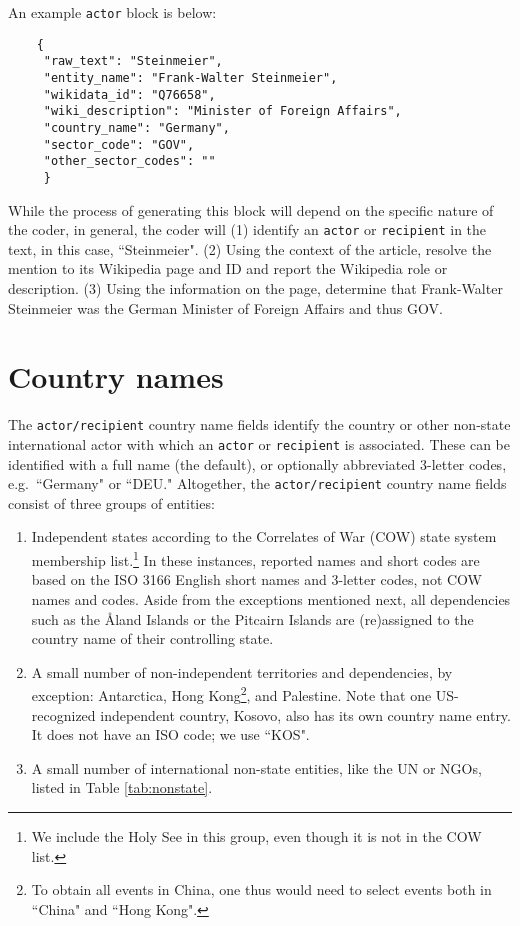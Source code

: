 \documentclass[11pt]{report}
\newcommand{\txt}[1]{\texttt{#1}}
\begin{document}
An example \txt{actor} block is below:

\begin{verbatim}
	{
	 "raw_text": "Steinmeier",
	 "entity_name": "Frank-Walter Steinmeier",
	 "wikidata_id": "Q76658",
	 "wiki_description": "Minister of Foreign Affairs",
	 "country_name": "Germany",
	 "sector_code": "GOV",
	 "other_sector_codes": ""
	 }
\end{verbatim}

While the process of generating this block will depend on the specific nature of the coder, in general, the coder will (1) identify an  \txt{actor} or \txt{recipient} in the text, in this case, ``Steinmeier". (2) Using the context of the article, resolve the mention to its Wikipedia page and ID and report the Wikipedia role or description. (3) Using the information on the page, determine that Frank-Walter Steinmeier was the German Minister of Foreign Affairs and thus GOV.

\section{Country names}

The \texttt{actor/recipient} country name fields identify the country or other non-state international actor with which an \texttt{actor} or \texttt{recipient} is associated. These can be identified with a full name (the default), or optionally abbreviated 3-letter codes, e.g.\ ``Germany" or ``DEU." Altogether, the \texttt{actor/recipient} country name fields consist of three groups of entities:

\begin{enumerate}
\item Independent states according to the Correlates of War (COW) state system membership list.\footnote{We include the Holy See in this group, even though it is not in the COW list.} In these instances, reported names and short codes are based on the ISO 3166 English short names and 3-letter codes, not COW names and codes. Aside from the exceptions mentioned next, all dependencies such as the \AA land Islands or the Pitcairn Islands are (re)assigned to the country name of their controlling state.
\item A small number of non-independent territories and dependencies, by exception: Antarctica, Hong Kong\footnote{To obtain all events in China, one thus would need to select events both in ``China" and ``Hong Kong".}, and Palestine. Note that one US-recognized independent country, Kosovo, also has its own country name entry. It does not have an ISO code; we use ``KOS".
\item A small number of international non-state entities, like the UN or NGOs, listed in Table \ref{tab:nonstate}.
\end{enumerate}
\end{document}
